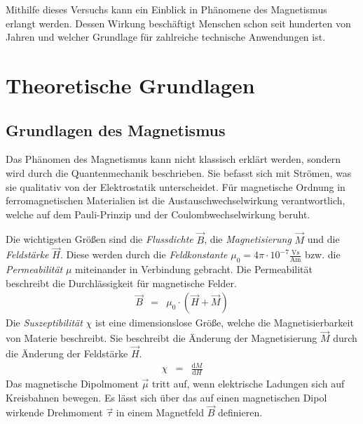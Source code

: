 \documentclass[12pt,a4paper]{scrartcl}
\numberwithin{equation}{section} %
\newcommand{\pu}[1]{\ensuremath{\mathrm{#1}}}
\renewcommand{\[}{} %
\renewcommand{\]}{\noindent} %
\begin{document}
Mithilfe dieses Versuchs kann ein Einblick in Phänomene des Magnetismus erlangt werden. Dessen Wirkung beschäftigt Menschen schon seit hunderten von Jahren und welcher Grundlage für zahlreiche technische Anwendungen ist.

\clearpage
\hypertarget{theoretische-grundlagen}{%
\section{Theoretische Grundlagen}\label{theoretische-grundlagen}}

\hypertarget{grundlagen-des-magnetismus}{%
\subsection{Grundlagen des Magnetismus}\label{grundlagen-des-magnetismus}}
Das Phänomen des Magnetismus kann nicht klassisch erklärt werden, sondern wird durch die Quantenmechanik beschrieben. Sie befasst sich mit Strömen, was sie qualitativ von der Elektrostatik unterscheidet. Für magnetische Ordnung in ferromagnetischen Materialien ist die
Austauschwechselwirkung verantwortlich, welche auf dem Pauli-Prinzip und der Coulombwechselwirkung beruht.

Die wichtigsten Größen sind die \emph{Flussdichte} \(\vec B\), die \emph{Magnetisierung} \(\vec M\) und die \emph{Feldstärke} \(\vec H\). Diese werden durch die \emph{Feldkonstante}
\(\mu_0=4\pi\cdot\pu{10^{-7}\frac{Vs}{Am}}\) bzw. die \emph{Permeabilität} \(\mu\) miteinander in Verbindung gebracht. Die Permeabilität beschreibt die Durchlässigkeit für magnetische Felder. \cite{Jackson}
\begin{eqnarray}
    \vec B &=& \mu_0 \cdot \left(\vec H + \vec M\right) \label{M1}
\end{eqnarray}
Die \emph{Suszeptibilität} \(\chi\) ist eine dimensionslose Größe, welche die Magnetisierbarkeit von Materie beschreibt. Sie beschreibt die Änderung der Magnetisierung \(\vec M\) durch die Änderung der Feldstärke \(\vec H\).
\begin{eqnarray}
    \chi &=& \frac{\mathrm dM}{\mathrm dH} \label{Chi}
\end{eqnarray}
Das magnetische Dipolmoment \(\vec \mu\) tritt auf, wenn elektrische Ladungen sich auf Kreisbahnen bewegen. Es lässt sich über das auf einen magnetischen Dipol wirkende Drehmoment \(\vec \tau\) in einem Magnetfeld \(\vec B\) definieren.
\end{document}
